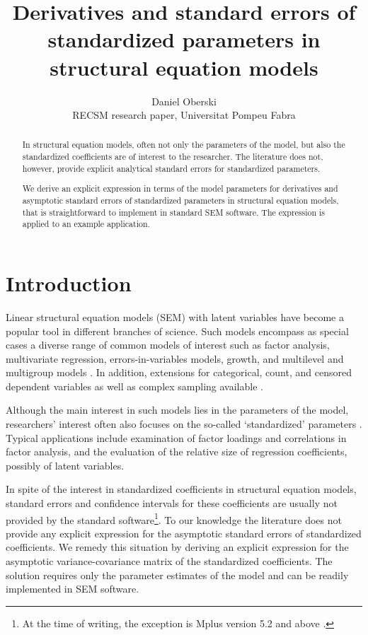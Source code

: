 \documentclass[a4paper, 11pt]{article}
\title{Derivatives and standard errors of standardized parameters in structural
equation models}
\author{Daniel Oberski\\RECSM research paper, Universitat Pompeu Fabra}
\newcommand{\0}{\boldsymbol{0}}
\begin{document}
\maketitle

\begin{abstract}\noindent
In structural equation models, often not only the parameters of the model, but
also the standardized coefficients are of interest to the researcher. 
The literature does not, however, provide explicit analytical standard errors
for standardized parameters. %

We derive an explicit expression in terms of the model parameters 
for derivatives and asymptotic standard errors of 
standardized parameters in structural equation models, that is straightforward to implement in standard SEM software. 
The expression is applied to an example application. 
\end{abstract}

\section{Introduction}\noindent

Linear structural equation models (SEM) with latent variables
have become a popular tool in different branches of science. Such models encompass as special cases a diverse range of common models of interest such as factor
analysis, multivariate regression, errors-in-variables models, growth, and
multilevel and multigroup models \citep{bollen1989structural}. In addition, extensions for categorical, count,
and censored dependent variables as well as complex sampling 
available \citep{muthen1995complex,muthen2002beyond}.

Although the main interest in such models lies in the parameters of 
the model, researchers' interest often also focuses on the so-called 
`standardized' parameters \citep{bollen1989structural}. Typical applications include examination of factor loadings and correlations in factor analysis, and the evaluation of the relative size of regression coefficients, possibly of latent variables.

In spite of the interest in standardized coefficients in structural equation models, standard errors and confidence intervals for these coefficients are usually not provided by the standard software\footnote{At the time of writing, the exception is Mplus version 5.2 and above \citep{muthen1998mplus}.}. To our knowledge the literature does not provide any explicit expression for the asymptotic standard errors of standardized coefficients. We remedy this situation by deriving an explicit expression for the asymptotic variance-covariance matrix of the standardized coefficients. The solution requires only the parameter estimates of the model and can be readily implemented in SEM software.
\end{document}
